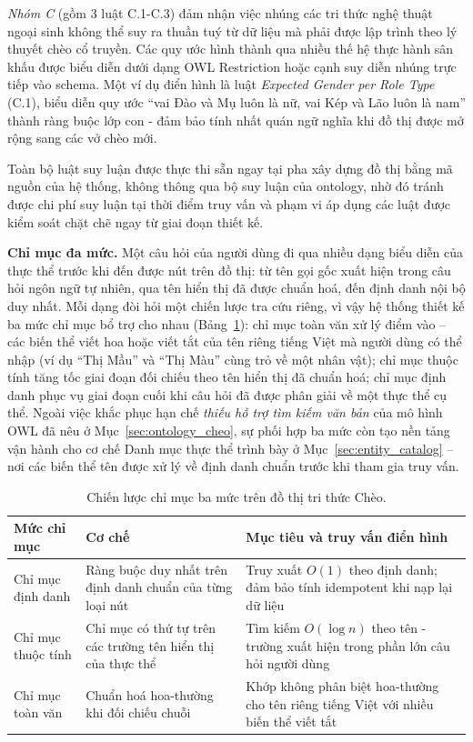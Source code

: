 \textit{Nhóm C} (gồm 3 luật C.1-C.3) đảm nhận việc nhúng các tri thức nghệ thuật ngoại sinh không thể suy ra thuần tuý từ dữ liệu mà phải được lập trình theo lý thuyết chèo cổ truyền. Các quy ước hình thành qua nhiều thế hệ thực hành sân khấu được biểu diễn dưới dạng OWL Restriction hoặc cạnh suy diễn nhúng trực tiếp vào schema. Một ví dụ điển hình là luật \textit{Expected Gender per Role Type} (C.1), biểu diễn quy ước ``vai Đào và Mụ luôn là nữ, vai Kép và Lão luôn là nam'' thành ràng buộc lớp con - đảm bảo tính nhất quán ngữ nghĩa khi đồ thị được mở rộng sang các vở chèo mới.

Toàn bộ luật suy luận được thực thi sẵn ngay tại pha xây dựng đồ thị bằng mã nguồn của hệ thống, không thông qua bộ suy luận của ontology, nhờ đó tránh được chi phí suy luận tại thời điểm truy vấn và phạm vi áp dụng các luật được kiểm soát chặt chẽ ngay từ giai đoạn thiết kế.

\textbf{Chỉ mục đa mức.}
Một câu hỏi của người dùng đi qua nhiều dạng biểu diễn của thực thể trước khi đến được nút trên đồ thị: từ tên gọi gốc xuất hiện trong câu hỏi ngôn ngữ tự nhiên, qua tên hiển thị đã được chuẩn hoá, đến định danh nội bộ duy nhất. Mỗi dạng đòi hỏi một chiến lược tra cứu riêng, vì vậy hệ thống thiết kế ba mức chỉ mục bổ trợ cho nhau (Bảng~\ref{tab:index_strategy}): chỉ mục toàn văn xử lý điểm vào -- các biến thể viết hoa hoặc viết tắt của tên riêng tiếng Việt mà người dùng có thể nhập (ví dụ ``Thị Mầu'' và ``Thị Màu'' cùng trỏ về một nhân vật); chỉ mục thuộc tính tăng tốc giai đoạn đối chiếu theo tên hiển thị đã chuẩn hoá; chỉ mục định danh phục vụ giai đoạn cuối khi câu hỏi đã được phân giải về một thực thể cụ thể. Ngoài việc khắc phục hạn chế \textit{thiếu hỗ trợ tìm kiếm văn bản} của mô hình OWL đã nêu ở Mục~\ref{sec:ontology_cheo}, sự phối hợp ba mức còn tạo nền tảng vận hành cho cơ chế Danh mục thực thể trình bày ở Mục~\ref{sec:entity_catalog} -- nơi các biến thể tên được xử lý về định danh chuẩn trước khi tham gia truy vấn.

\begin{table}[ht!]
  \centering
  \caption{Chiến lược chỉ mục ba mức trên đồ thị tri thức Chèo.}
  \label{tab:index_strategy}
  \renewcommand{\arraystretch}{1.35}
  \small
  \begin{tabular}{p{3.2cm} p{4.8cm} p{6.79cm}}
    \toprule
    \textbf{Mức chỉ mục} & \textbf{Cơ chế} & \textbf{Mục tiêu và truy vấn điển hình} \\
    \midrule
    Chỉ mục định danh
      & Ràng buộc duy nhất trên định danh chuẩn của từng loại nút
      & Truy xuất $O(1)$ theo định danh; đảm bảo tính idempotent khi nạp lại dữ liệu \\[4pt]
    Chỉ mục thuộc tính
      & Chỉ mục có thứ tự trên các trường tên hiển thị của thực thể
      & Tìm kiếm $O(\log n)$ theo tên - trường xuất hiện trong phần lớn câu hỏi người dùng \\[4pt]
    Chỉ mục toàn văn
      & Chuẩn hoá hoa-thường khi đối chiếu chuỗi
      & Khớp không phân biệt hoa-thường cho tên riêng tiếng Việt với nhiều biến thể viết tắt \\
    \bottomrule
  \end{tabular}
\end{table}

